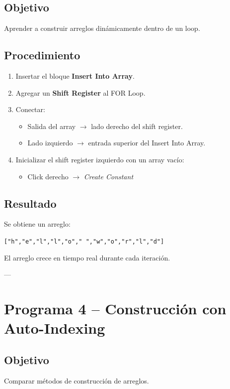 \documentclass[12pt]{article}
\begin{document}
\subsection*{Objetivo}
Aprender a construir arreglos dinámicamente dentro de un loop.

\subsection*{Procedimiento}

\begin{enumerate}
    \item Insertar el bloque \textbf{Insert Into Array}.
    \item Agregar un \textbf{Shift Register} al FOR Loop.
    \item Conectar:
    \begin{itemize}
        \item Salida del array $\rightarrow$ lado derecho del shift register.
        \item Lado izquierdo $\rightarrow$ entrada superior del Insert Into Array.
    \end{itemize}
    \item Inicializar el shift register izquierdo con un array vacío:
    \begin{itemize}
        \item Click derecho $\rightarrow$ \textit{Create Constant}
    \end{itemize}
\end{enumerate}

\subsection*{Resultado}

Se obtiene un arreglo:

\begin{center}
\texttt{["h","e","l","l","o"," ","w","o","r","l","d"]}
\end{center}

El arreglo crece en tiempo real durante cada iteración.

---

\section{Programa 4 – Construcción con Auto-Indexing}

\subsection*{Objetivo}
Comparar métodos de construcción de arreglos.
\end{document}
